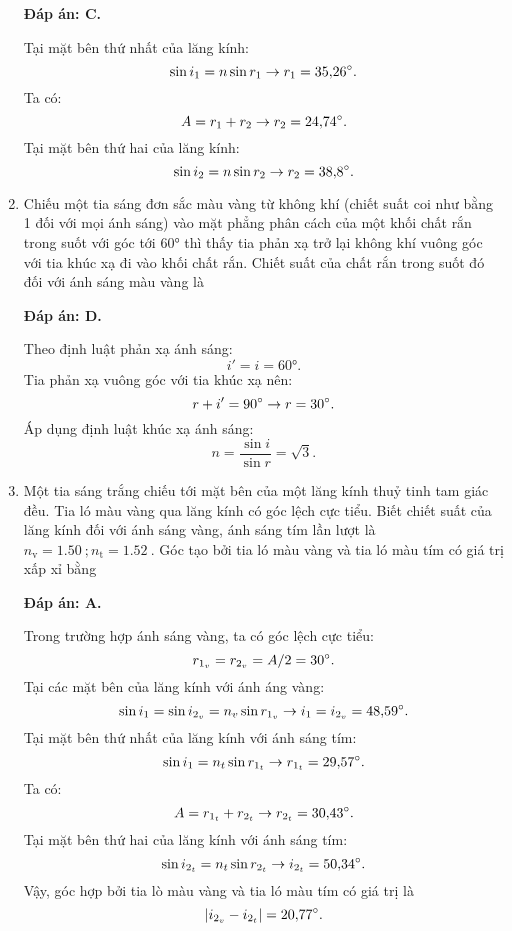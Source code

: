 \begin{enumerate}[label=\bfseries Câu \arabic*:]
	\loigiai
	{		\textbf{Đáp án: C.}
		
Tại mặt bên thứ nhất của lăng kính:
$$
	\sin i_{1} = n \sin r_{1} \rightarrow r_{1} = \num{35,26}^\circ.
$$
Ta có:
$$
	A = r_{1} + r_{2} \rightarrow r_{2} = \num{24,74}^\circ.
$$
Tại mặt bên thứ hai của lăng kính:
$$
	\sin i_{2} = n \sin r_{2} \rightarrow r_{2} = \num{38,8}^\circ.
$$
	}
	
	\item {} 
	
	\cauhoi
	{Chiếu một tia sáng đơn sắc màu vàng từ không khí (chiết suất coi như bằng 1 đối với mọi ánh sáng) vào mặt phẳng phân cách của một khối chất rắn trong suốt với góc tới $\ang{60}$ thì thấy tia phản xạ trở lại không khí vuông góc với tia khúc xạ đi vào khối chất rắn. Chiết suất của chất rắn trong suốt đó đối với ánh sáng màu vàng là
	}
	
	\loigiai
	{		\textbf{Đáp án: D.}
		

Theo định luật phản xạ ánh sáng:
$$
	i' = i = \ang{60}.
$$
Tia phản xạ vuông góc với tia khúc xạ nên: 
$$
	r + i' = \num{90}^\circ \rightarrow r = 30^\circ.
$$
Áp dụng định luật khúc xạ ánh sáng:
$$
	n = \dfrac{\sin i}{\sin r} = \sqrt{3}.
$$
	}
	
	\item {}
	
	\cauhoi
	{Một tia sáng trắng chiếu tới mặt bên của một lăng kính thuỷ tinh tam giác đều. Tia ló màu vàng qua lăng kính có góc lệch cực tiểu. Biết chiết suất của lăng kính đối với ánh sáng vàng, ánh sáng tím lần lượt là $n_\text{v} = \SI{1.50}{}; n_\text{t}=\SI{1.52}{}$. Góc tạo bởi tia ló màu vàng và tia ló màu tím có giá trị xấp xỉ bằng
	}
	
	\loigiai
	{		\textbf{Đáp án: A.}
		
Trong trường hợp ánh sáng vàng, ta có góc lệch cực tiểu:
$$
	r_{1_v} = r_{2_v} = A/2 = \num{30}^\circ.
$$
Tại các mặt bên của lăng kính với ánh áng vàng:
$$
	\sin i_{1} = \sin i_{2_v} = n_{v} \sin r_{1_v} \rightarrow i_{1} = i_{2_v} = \num{48,59}^\circ.
$$
Tại mặt bên thứ nhất của lăng kính với ánh sáng tím:
$$
	\sin i_{1} = n_{t} \sin r_{1_t} \rightarrow r_{1_t} = \num{29,57}^\circ.
$$
Ta có:
$$
	A = r_{1_t} + r_{2_t} \rightarrow r_{2_t} = \num{30,43}^\circ.
$$
Tại mặt bên thứ hai của lăng kính với ánh sáng tím:
$$
	\sin i_{2_t} = n_{t} \sin r_{2_t} \rightarrow i_{2_t} = \num{50,34}^\circ.
$$
Vậy, góc hợp bởi tia lò màu vàng và tia ló màu tím có giá trị là
$$
	| i_{2_v} - i_{2_t} | = \num{20,77}^\circ.
$$
		
}
\end{enumerate}
